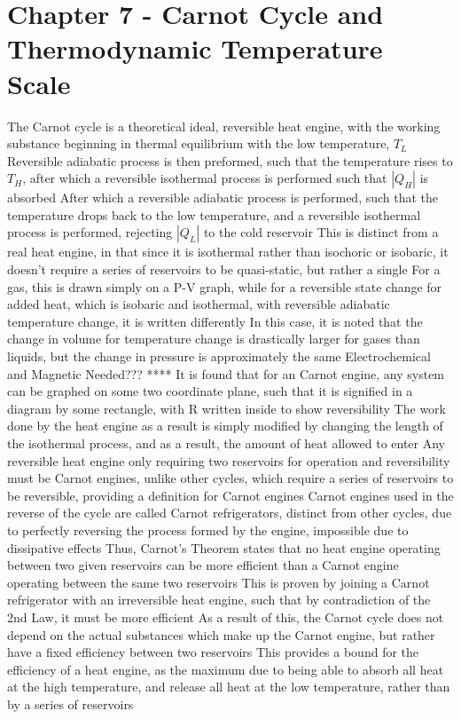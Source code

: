 \documentclass[11 pt, twoside]{article}
\newenvironment{outline*}
{
	\begin{outline}[enumerate]
	}
	{\end{outline}
}
\begin{document}
\section{Chapter 7 - Carnot Cycle and Thermodynamic Temperature Scale}
\begin{outline*}
\1 The Carnot cycle is a theoretical ideal, reversible heat engine, with the working substance beginning in thermal equilibrium with the low temperature, $T_L$
\2 Reversible adiabatic process is then preformed, such that the temperature rises to $T_H$, after which a reversible isothermal process is performed such that $|Q_H|$ is absorbed
\2 After which a reversible adiabatic process is performed, such that the temperature drops back to the low temperature, and a reversible isothermal process is performed, rejecting $|Q_L|$ to the cold reservoir
\2 This is distinct from a real heat engine, in that since it is isothermal rather than isochoric or isobaric, it doesn't require a series of reservoirs to be quasi-static, but rather a single
\1 For a gas, this is drawn simply on a P-V graph, while for a reversible state change for added heat, which is isobaric and isothermal, with reversible adiabatic temperature change, it is written differently
\2 In this case, it is noted that the change in volume for temperature change is drastically larger for gases than liquids, but the change in pressure is approximately the same
\3 Electrochemical and Magnetic Needed??? ****
\3 It is found that for an Carnot engine, any system can be graphed on some two coordinate plane, such that it is signified in a diagram by some rectangle, with R written inside to show reversibility
\2 The work done by the heat engine as a result is simply modified by changing the length of the isothermal process, and as a result, the amount of heat allowed to enter
\1 Any reversible heat engine only requiring two reservoirs for operation and reversibility must be Carnot engines, unlike other cycles, which require a series of reservoirs to be reversible, providing a definition for Carnot engines
\2 Carnot engines used in the reverse of the cycle are called Carnot refrigerators, distinct from other cycles, due to perfectly reversing the process formed by the engine, impossible due to dissipative effects
\2 Thus, Carnot's Theorem states that no heat engine operating between two given reservoirs can be more efficient than a Carnot engine operating between the same two reservoirs
\3 This is proven by joining a Carnot refrigerator with an irreversible heat engine, such that by contradiction of the 2nd Law, it must be more efficient
\3 As a result of this, the Carnot cycle does not depend on the actual substances which make up the Carnot engine, but rather have a fixed efficiency between two reservoirs
\3 This provides a bound for the efficiency of a heat engine, as the maximum due to being able to absorb all heat at the high temperature, and release all heat at the low temperature, rather than by a series of reservoirs
\end{outline*}
\end{document}
